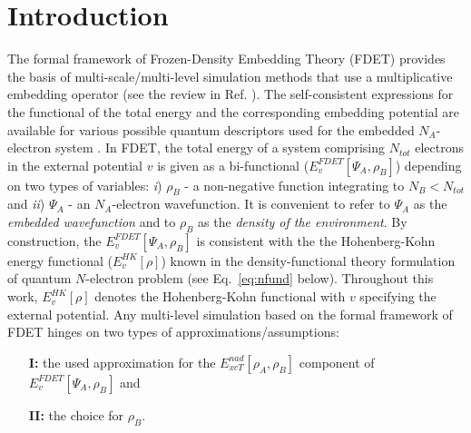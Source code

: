 \documentclass[amsmath,amssymb,preprint,aip,jcp]{revtex4-1}
\begin{document}
\section{Introduction}\label{sec:intro}
The formal framework of 
Frozen-Density Embedding Theory (FDET) provides the basis of multi-scale/multi-level simulation methods that use a multiplicative embedding operator (see the review in Ref. ).  The self-consistent expressions for the functional of the total energy and the corresponding embedding potential are available for various possible quantum descriptors used for the embedded $N_A$-electron system \cite{Wesolowski1993,Wesolowski2008,Pernal2009,Wesolowski2020}. 
In FDET, the total energy of a system comprising $N_{tot}$ electrons in the external potential $v$ is given as a bi-functional (${E}_{v}^{FDET}[\Psi_{A},\rho_B]$) depending on two types of variables:  {\it i}) $\rho_B$ - a non-negative function integrating to $N_B<N_{tot}$ and  {\it ii}) $\Psi_A$ - an $N_A$-electron wavefunction. 
It is convenient to refer to $\Psi_A$ as the {\it embedded wavefunction} and to $\rho_B$ as the {\it density of the environment}.
By construction, the ${E}_{v}^{FDET}[\Psi_{A},\rho_B]$ is consistent with the 
 the Hohenberg-Kohn energy functional ($E_{v}^{HK}[\rho]$) known in the density-functional theory \cite{Hohenberg1964} formulation of quantum $N$-electron problem (see Eq.~\ref{eq:nfund} below).
{\color{red}Throughout this work, $E_v^{HK}[\rho]$ denotes 
the Hohenberg-Kohn functional with $v$ specifying the external potential.} 
Any multi-level simulation based on the formal framework of FDET
hinges on two types of approximations/assumptions: 
{\color{red}
\begin{itemize} 
\item[{\bf I:}]
the used approximation for the ${E}_{xcT}^{nad}[\rho_A,\rho_B]$ %
component of  ${E}_{v}^{FDET}[\Psi_{A},\rho_B]$ 
and 
\item[{\bf II:}]
the choice for  $\rho_B$.
\end{itemize}
} 
\end{document}
